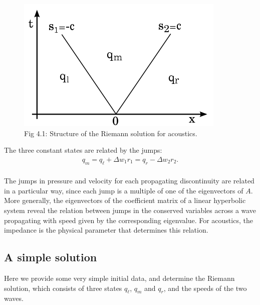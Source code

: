 \documentclass{SIAMbook2016}
\makeatletter
\def\maxwidth{\ifdim\Gin@nat@width>\linewidth\linewidth
    \else\Gin@nat@width\fi}
\let\Oldincludegraphics\includegraphics
\renewcommand{\includegraphics}[1]{\Oldincludegraphics[width=.8\maxwidth]{#1}}
\makeatother
\begin{document}
\begin{figure}
\centering
\includegraphics{./figures/acoustics_xt_plane.png}
\caption{Fig 4.1: Structure of the Riemann solution for acoustics.}
\end{figure}

The three constant states are related by the jumps:\\
\begin{align}
q_m = q_\ell + \Delta w_1 r_1 = q_r - \Delta w_2 r_2.
\label{eq:acussol}
\end{align}\\
The jumps in pressure and velocity for each propagating discontinuity
are related in a particular way, since each jump is a multiple of one of
the eigenvectors of \(A\). More generally, the eigenvectors of the
coefficient matrix of a linear hyperbolic system reveal the relation
between jumps in the conserved variables across a wave propagating with
speed given by the corresponding eigenvalue. For acoustics, the
impedance is the physical parameter that determines this relation.

\hypertarget{a-simple-solution}{%
\subsection{A simple solution}\label{a-simple-solution}}

Here we provide some very simple initial data, and determine the Riemann
solution, which consists of three states \(q_\ell\), \(q_m\) and
\(q_r\), and the speeds of the two waves.
\end{document}

